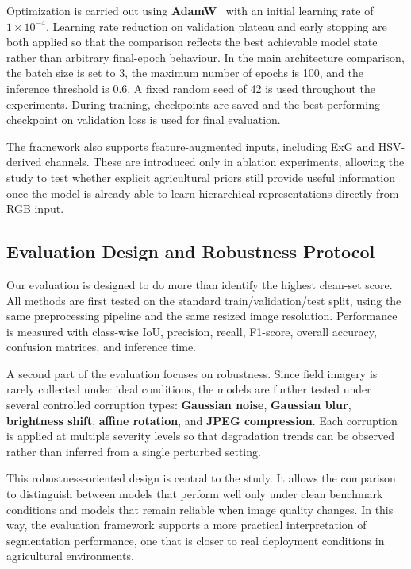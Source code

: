 \documentclass[conference]{IEEEtran}
\begin{document}
Optimization is carried out using \textbf{AdamW}~\cite{loshchilov2019}
with an initial
learning rate of $1 \times 10^{-4}$. Learning rate reduction on
validation plateau and early stopping are both applied so that the
comparison reflects the best achievable model state rather than
arbitrary final-epoch behaviour. In the main architecture comparison,
the batch size is set to 3, the maximum number of epochs is 100, and
the inference threshold is 0.6. A fixed random seed of 42 is used
throughout the experiments. During training, checkpoints are saved and
the best-performing checkpoint on validation loss is used for final
evaluation.

The framework also supports feature-augmented inputs, including ExG and
HSV-derived channels. These are introduced only in ablation experiments,
allowing the study to test whether explicit agricultural priors still
provide useful information once the model is already able to learn
hierarchical representations directly from RGB input.

\subsection{Evaluation Design and Robustness Protocol}

Our evaluation is designed to do more than identify the highest
clean-set score. All methods are first tested on the standard
train/validation/test split, using the same preprocessing pipeline and
the same resized image resolution. Performance is measured with
class-wise IoU, precision, recall, F1-score, overall accuracy,
confusion matrices, and inference time.

A second part of the evaluation focuses on robustness. Since field
imagery is rarely collected under ideal conditions, the models are
further tested under several controlled corruption types:
\textbf{Gaussian noise}, \textbf{Gaussian blur}, \textbf{brightness
shift}, \textbf{affine rotation}, and \textbf{JPEG compression}. Each
corruption is applied at multiple severity levels so that degradation
trends can be observed rather than inferred from a single perturbed
setting.

This robustness-oriented design is central to the study. It allows the
comparison to distinguish between models that perform well only under
clean benchmark conditions and models that remain reliable when image
quality changes. In this way, the evaluation framework supports a more
practical interpretation of segmentation performance, one that is closer
to real deployment conditions in agricultural environments.
\end{document}
